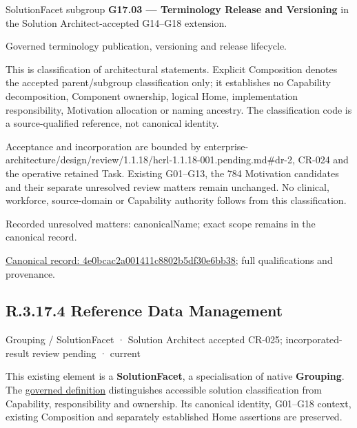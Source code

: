 SolutionFacet subgroup \textbf{G17.03 — Terminology Release and Versioning} in the Solution Architect-accepted G14–G18 extension.



Governed terminology publication, versioning and release lifecycle.



This is classification of architectural statements. Explicit Composition denotes the accepted parent/subgroup classification only; it establishes no Capability decomposition, Component ownership, logical Home, implementation responsibility, Motivation allocation or naming ancestry. The classification code is a source-qualified reference, not canonical identity.



Acceptance and incorporation are bounded by enterprise-architecture/design/review/1.1.18/hcrl-1.1.18-001.pending.md\#dr-2, CR-024 and the operative retained Task. Existing G01–G13, the 784 Motivation candidates and their separate unresolved review matters remain unchanged. No clinical, workforce, source-domain or Capability authority follows from this classification.


{\small Recorded unresolved matters: canonicalName; exact scope remains in the canonical record.}\par
{\footnotesize \href{../../../../../../../continuum/grouping/4e0bcac2a001411c8802b5df30e6bb38.md}{Canonical record: 4e0bcac2a001411c8802b5df30e6bb38}; full qualifications and provenance.}\par
\subsection*{R.3.17.4 Reference Data Management}
\label{navigation:R.3.17.4}

\label{element:ba0e7f67e2e7496d9df8f6617ee39ec3}
{\small Grouping / SolutionFacet · Solution Architect accepted CR-025; incorporated-result review pending · current}\par

This existing element is a \textbf{SolutionFacet}, a specialisation of native
\textbf{Grouping}. The \href{\detokenize{../../../../../../../governance/continuum-representation.md#solutionfacet-classification--1119-candidate}}{governed definition}
distinguishes accessible solution classification from Capability, responsibility
and ownership. Its canonical identity, G01–G18 context, existing Composition
and separately established Home assertions are preserved.



